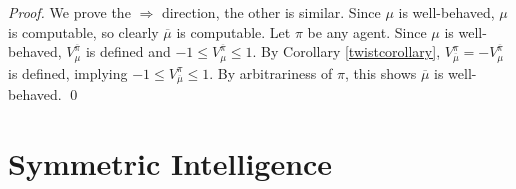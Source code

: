 \documentclass[runningheads]{llncs}
\begin{document}
\begin{proof}
    We prove the $\Rightarrow$ direction, the other is similar.
    Since $\mu$ is well-behaved, $\mu$ is computable, so clearly $\overline\mu$ is computable.
    Let $\pi$ be any agent. Since $\mu$ is well-behaved, $V^{\overline\pi}_\mu$ is defined
    and $-1\leq V^{\overline\pi}_\mu\leq 1$.
    By Corollary \ref{twistcorollary},
    $V^\pi_{\overline\mu}=-V^{\overline\pi}_\mu$ is defined,
    implying $-1\leq V^\pi_{\overline\mu}\leq 1$.
    By arbitrariness of $\pi$, this shows $\overline\mu$ is well-behaved.
    \qed
\end{proof}

\section{Symmetric Intelligence}
\label{mainsecn}
\end{document}

